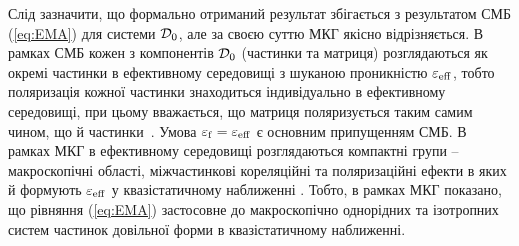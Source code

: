 \documentclass[14pt,twoside]{vakthesis}
\begin{document}
Слід зазначити, що формально отриманий результат збігається з результатом СМБ (\ref{eq:EMA}) для системи ${\cal D}_0$, але за своєю суттю МКГ якісно відрізняється. В рамках СМБ кожен з компонентів ${\cal D}_0$ (частинки та матриця) розглядаються як окремі частинки в ефективному середовищі з шуканою проникністю $\varepsilon_{\rm eff}$, тобто поляризація кожної частинки знаходиться індивідуально в ефективному середовищі, при цьому вважається, що матриця поляризується таким самим чином, що й частинки~\cite{Banheg1986}. Умова $\varepsilon_{\rm f} = \varepsilon_{\rm eff}$ є основним припущенням  СМБ. В рамках МКГ в ефективному середовищі розглядаються компактні групи -- макроскопічні області, міжчастинкові кореляційні та поляризаційні ефекти в яких й формують $\varepsilon_{\rm eff}$ у квазістатичному наближенні \cite{Sushko2017}. Тобто, в рамках МКГ показано, що рівняння (\ref{eq:EMA}) застосовне до макроскопічно однорідних та ізотропних систем частинок довільної форми в квазістатичному наближенні. 

\end{document}
